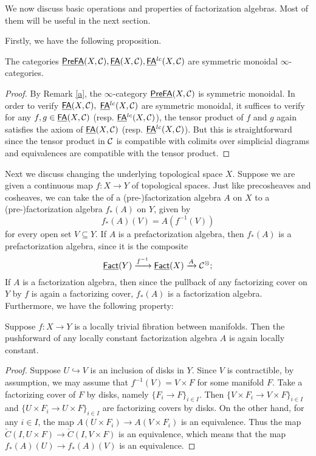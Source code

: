 \documentclass[twoside]{article}
\begin{document}
We now discuss basic operations and properties of factorization algebras. Most
of them will be useful in the next section.

Firstly, we have the following proposition.

\begin{proposition}
    The categories $\underline{\smash{\mathsf{PreFA}}}(X,\mathcal C),\underline{\smash{\mathsf{FA}}}(X,\mathcal C),\underline{\smash{\mathsf{FA}}}^{lc}(X,\mathcal C)$
    are symmetric monoidal $\infty$-categories.
\end{proposition}

\begin{proof}
    By Remark \ref{a}, the $\infty$-category $\underline{\smash{\mathsf{PreFA}}}(X,\cal C)$
    is symmetric monoidal. In order to verify $\underline{\smash{\mathsf{FA}}}(X,\cal C),$ $\underline{\smash{\mathsf{FA}}}^{lc}(X,\cal C)$
    are symmetric monoidal, it suffices to verify for any $f,g\in\underline{\smash{\mathsf{FA}}}(X,\cal C)$
    (resp. $\underline{\smash{\mathsf{FA}}}^{lc}(X,\cal C)$), the tensor product of $f$ and $g$ again satisfies
    the axiom of $\underline{\smash{\mathsf{FA}}}(X,\cal C)$ (resp. $\underline{\smash{\mathsf{FA}}}^{lc}(X,\cal C)$). But this is
    straightforward since the tensor product in $\cal C$ is compatible with
    colimits over simplicial diagrams and equivalences are compatible with
    the tensor product.
\end{proof}

Next we discuss changing the underlying topological space $X$. Suppose we are
given a continuous map $f:X\to Y$ of topological spaces. Just like precosheaves
and cosheaves, we can take the  of a (pre-)factorization algebra $A$
on $X$ to a (pre-)factorization algebra $f_*(A)$ on $Y$, given by
\[f_*(A)(V)=A(f^{-1}(V))\] for every open set $V\subseteq Y$. If $A$
is a prefactorization algebra, then $f_*(A)$ is a prefactorization algebra, since
it is the composite \[\underline{\smash{\mathsf{Fact}}}(Y)\xrightarrow{f^{-1}}\underline{\smash{\mathsf{Fact}}}(X)\xrightarrow{A}
\cal C^\otimes;\] If $A$ is a factorization algebra, then since the pullback of 
any factorizing cover on $Y$ by $f$ is again a factorizing cover, 
$f_*(A)$ is a factorization algebra. Furthermore, we have
the following property:

\begin{proposition}\label{b}
    Suppose $f:X\to Y$ is a locally trivial fibration between manifolds. Then
    the pushforward of any locally constant factorization algebra $A$ is again
    locally constant.
\end{proposition}

\begin{proof}
    Suppose $U\hookrightarrow V$ is an inclusion of disks in $Y$. Since $V$
    is contractible, by assumption, we may assume that $f^{-1}(V)=V\times F$
    for some manifold $F$. Take a factorizing cover of $F$ by disks, namely
    $\{F_i\to F\}_{i\in I}$. Then $\{V\times F_i\to V\times F\}
    _{i\in I}$ and $\{U\times F_i\to U\times F\}_{i\in I}$ are factorizing covers
    by disks. On the other hand, for any $i\in I$, the map $A(U\times F_i)
    \to A(V\times F_i)$ is an equivalence. Thus the map $\check{C}(I,U\times F)
    \to\check{C}(I,V\times F)$ is an equivalence, which means that the map
    $f_*(A)(U)\to f_*(A)(V)$ is an equivalence.
\end{proof}
\end{document}
